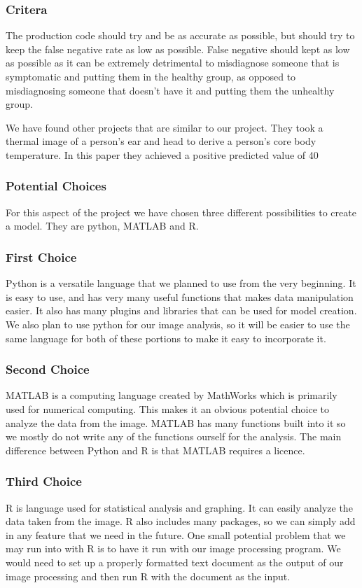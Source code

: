 	\subsubsection*{Critera}
	The production code should try and be as accurate as possible, but should try to keep the false negative rate as low as possible. False negative should kept as low as possible as it can be extremely detrimental to misdiagnose someone that is symptomatic and putting them in the healthy group, as opposed to misdiagnosing someone that doesn’t have it and putting them the unhealthy group.
	
	We have found other projects that are similar to our project. They took a thermal image of a person’s ear and head to derive a person’s core body temperature. In this paper they achieved a positive predicted value of 40%
	\subsubsection*{Potential Choices}
	For this aspect of the project we have chosen three different possibilities to create a model. They are python, MATLAB and R.
	\subsubsection*{First Choice}
	Python is a versatile language that we planned to use from the very beginning. It is easy to use, and has very many useful functions that makes data manipulation easier. It also has many plugins and libraries that can be used for model creation. We also plan to use python for our image analysis, so it will be easier to use the same language for both of these portions to make it easy to incorporate it.
	\subsubsection*{Second Choice}
	MATLAB is a computing language created by MathWorks which is primarily used for numerical computing. This makes it an obvious potential choice to analyze the data from the image. MATLAB has many functions built into it so we mostly do not write any of the functions ourself for the analysis. The main difference between Python and R is that MATLAB requires a licence.
	\subsubsection*{Third Choice}
	R is language used for statistical analysis and graphing. It can easily analyze the data taken from the image. R also includes many packages, so we can simply add in any feature that we need in the future. One small potential problem that we may run into with R is to have it run with our image processing program. We would need to set up a properly formatted text document as the output of our image processing and then run R with the document as the input.

